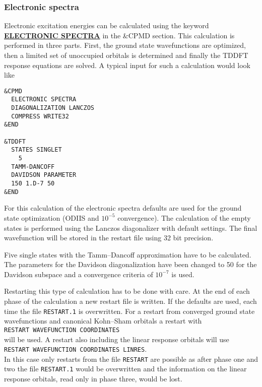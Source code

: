 \documentclass[twoside,10pt,titlepage,a4paper]{article}
\newcommand{\referto}[2]{\hyperlink{#1}{#2}}
\newcommand{\reflabel}[1]{\hypertarget{#1}}
\newcommand{\referto}[2]{\htmlref{#2}{#1}}
\newcommand{\reflabel}[1]{\label{#1}}
\newcommand{\refkeyword}[1]{%
\referto{#1}{\textbf{#1}}%
\index{#1}%
}%
\begin{document}
\subsubsection{Electronic spectra}
\reflabel{sec:ElectronicSpectra}{}

  Electronic excitation energies can be calculated using the keyword
\refkeyword{ELECTRONIC SPECTRA} in the \&CPMD section. This calculation is
performed in three parts. First, the ground state wavefunctions are optimized,
then a limited set of unoccupied orbitals is determined and finally the TDDFT
response equations are solved. A typical input for such a calculation would
look like

\begin{verbatim}
&CPMD
  ELECTRONIC SPECTRA
  DIAGONALIZATION LANCZOS
  COMPRESS WRITE32
&END

&TDDFT
  STATES SINGLET
    5
  TAMM-DANCOFF
  DAVIDSON PARAMETER
  150 1.D-7 50
&END
\end{verbatim}

  For this calculation of the electronic spectra defaults are used for the
ground state optimization (ODIIS and $10^{-5}$ convergence). The calculation of
the empty states is performed using the Lanczos diagonalizer with default
settings. The final wavefunction will be stored in the restart file using 32
bit precision.

  Five single states with the Tamm--Dancoff approximation have to be
calculated. The parameters for the Davidson diagonalization have been changed
to 50 for the Davidson subspace and a convergence criteria of $10^{-7}$ is
used.

  Restarting this type of calculation has to be done with care.
At the end of each phase of the calculation a new restart file
is written. If the defaults are used, each time the file \texttt{RESTART.1}
is overwritten. For a restart from converged ground state wavefunctions
and canonical Kohn--Sham orbitals a restart with \\
\texttt{RESTART WAVEFUNCTION COORDINATES} \\
will be used. A restart also including the linear response orbitals
will use \\
\texttt{RESTART WAVEFUNCTION COORDINATES LINRES}. \\
In this case only restarts from the file \texttt{RESTART} are possible
as after phase one and two the file \texttt{RESTART.1} would be
overwritten and the information on the linear response orbitals,
read only in phase three, would be lost.
\end{document}
